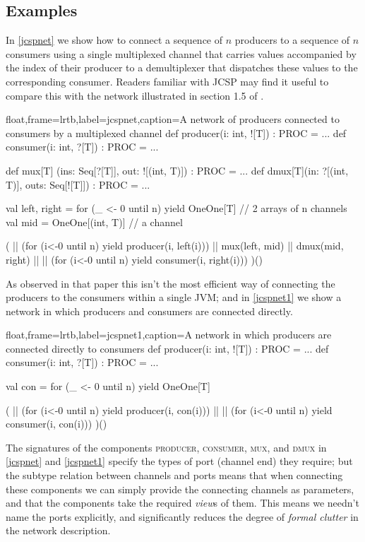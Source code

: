 \documentclass[12pt]{IOS-Book-Article-CPA-2017}
\begin{document}
\subsection{Examples}


In \Listing \ref{jcspnet} we show how to connect a sequence 
of $n$ producers to a sequence of $n$ consumers using a single
multiplexed channel that carries values accompanied by 
the index of their producer to a demultiplexer that dispatches these
values to the corresponding consumer.
Readers familiar with JCSP may find it useful to compare this
with the network illustrated in section 1.5 of \cite{jcsp2}.

\begin{code+}[...]{float,frame=lrtb,label=jcspnet,caption={A network of producers connected to consumers by a multiplexed channel}}
    def producer(i: int, ![T]) : PROC = ...
    def consumer(i: int, ?[T]) : PROC = ...
    
    def mux[T] (ins: Seq[?[T]],   out: ![(int, T)]) : PROC = ...
    def dmux[T](in:  ?[(int, T)], outs: Seq[![T]])  : PROC = ...
    
    
    val left, right = 
        for (_ <- 0 until n) yield OneOne[T] // 2 arrays of n channels
    val mid = OneOne[(int, T)]               // a channel
    
    (  || (for (i<-0 until n) yield producer(i, left(i)))
    || mux(left, mid)
    || dmux(mid, right)
    || || (for (i<-0 until n) yield consumer(i, right(i)))
    )()  
\end{code+}

As observed in that paper this isn't the most efficient
way of connecting the producers to the consumers within a single
JVM; and in \Listing \ref{jcspnet1} we show a network in which producers
and consumers are connected directly.

\begin{code+}{float,frame=lrtb,label=jcspnet1,caption={A network in which producers are connected directly to consumers}}
    def producer(i: int, ![T]) : PROC = ...
    def consumer(i: int, ?[T]) : PROC = ...
    
    val con = for (_ <- 0 until n) yield OneOne[T]
    
    (  || (for (i<-0 until n) yield producer(i, con(i)))
    || || (for (i<-0 until n) yield consumer(i, con(i)))
    )()  
\end{code+}

The signatures of the components \textsc{producer}, \textsc{consumer},
\textsc{mux}, and \textsc{dmux} in \Listings \ref{jcspnet} and
\ref{jcspnet1} specify the types of port (channel end) they require;
but the subtype relation between channels and ports means that when
connecting these components we can simply provide the connecting
channels as parameters, and that the components take the required
\textit{view}s of them. This means we needn't name the ports
explicitly, and significantly reduces the degree of \textit{formal
clutter} in the network description.
\end{document}
